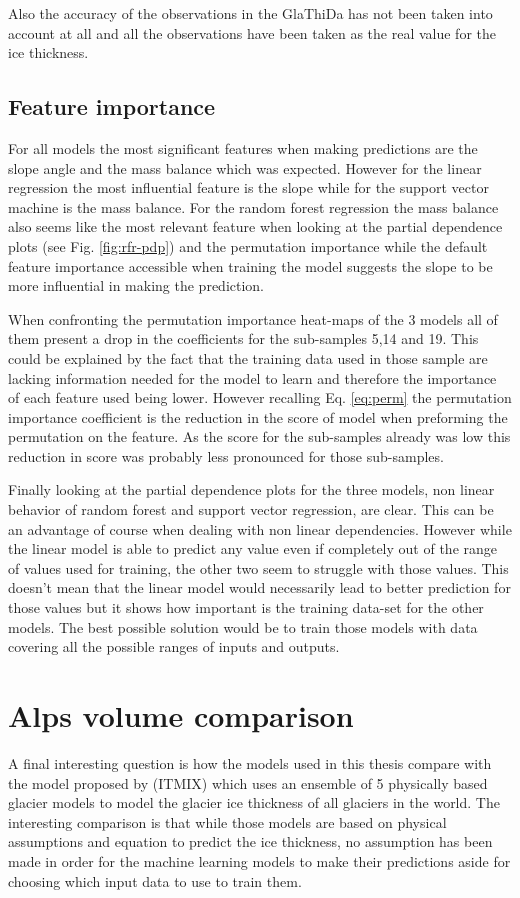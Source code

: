Also the accuracy of the observations in the GlaThiDa has not been taken into account at all and all the observations have been taken as the real value for the ice thickness.

\subsection{Feature importance}\label{disc-features}
For all models the most significant features when making predictions are the slope angle and the mass balance which was expected. However for the linear regression the most influential feature is the slope while for the support  vector machine is the mass balance. For the random forest regression the mass balance also seems like the most relevant feature when looking at the partial dependence plots (see Fig. \ref{fig:rfr-pdp}) and the permutation importance while the default feature importance accessible when training the model suggests the slope to be more influential in making the prediction.

When confronting the permutation importance heat-maps of the 3 models all of them present a drop in the coefficients for the sub-samples 5,14 and 19. This could be explained by the fact that the training data used in those sample are lacking information needed for the model to learn and therefore the importance of each feature used being lower. However recalling Eq. \ref{eq:perm} the permutation importance coefficient is the reduction in the score of model when preforming the permutation on the feature. As the score for the sub-samples already was low this reduction in score was probably less pronounced for those sub-samples. 

Finally looking at the partial dependence plots for the three models, non linear behavior of random forest and support vector regression, are clear. This can be an advantage of course when dealing with non linear dependencies. However while the linear model is able to predict any value even if completely out of the range of values used for training, the other two seem to struggle with those values. This doesn't mean that the linear model would necessarily lead to better prediction for those values but it shows how important is the training data-set for the other models. The best possible solution would be to train those models with data covering all the possible ranges of inputs and outputs.

\section{Alps volume comparison}\label{disc-alps}
A final interesting question is how the models used in this thesis compare with the model proposed by \citet{Farinotti2019} (ITMIX) which uses an ensemble of 5 physically based glacier models to model the glacier ice thickness of all glaciers in the world. The interesting comparison is that while those models are based on physical assumptions and  equation to predict the ice thickness, no assumption has been made in order for the machine learning models to make their predictions aside for choosing which input data to use to train them.
 
